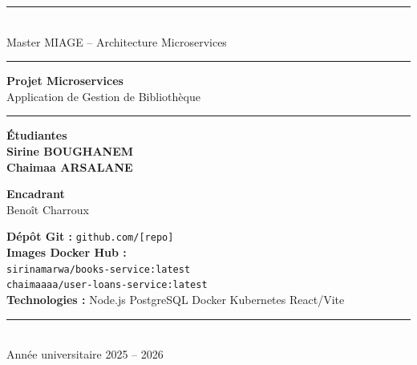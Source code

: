 \documentclass[12pt,a4paper]{article}
\begin{document}
\begin{titlepage}
  \thispagestyle{empty}
  \centering

  {\color{mainblue}\rule{\linewidth}{3pt}}\\[0.3cm]
  {\small\color{darkgray} Master MIAGE -- Architecture Microservices}\\[0.2cm]
  {\color{mainblue}\rule{\linewidth}{1pt}}

  \vspace{1.5cm}

  {\fontsize{34}{42}\bfseries\color{mainblue} Projet Microservices}\\[0.4cm]
  {\LARGE\color{darkgray} Application de Gestion de Bibliothèque}\\[0.6cm]

  {\color{mainblue}\rule{0.6\linewidth}{1.5pt}}

  \vspace{1cm}

  \begin{minipage}{0.45\textwidth}
    \raggedright
    {\small\color{darkgray}\textbf{Étudiantes}}\\[0.2cm]
    {\large\textbf{Sirine BOUGHANEM}}\\[0.1cm]
    {\large\textbf{Chaimaa ARSALANE}}
  \end{minipage}
  \hfill
  \begin{minipage}{0.45\textwidth}
    \raggedleft
    {\small\color{darkgray}\textbf{Encadrant}}\\[0.2cm]
    {\large Benoît Charroux}
  \end{minipage}

  \vspace{0.8cm}

  \begin{infobox}
  \textbf{Dépôt Git :} \texttt{github.com/[repo]}\\[2pt]
  \textbf{Images Docker Hub :}\\
  \quad \texttt{sirinamarwa/books-service:latest}\\
  \quad \texttt{chaimaaaa/user-loans-service:latest}\\[2pt]
  \textbf{Technologies :} Node.js \textbullet{} PostgreSQL \textbullet{} Docker \textbullet{} Kubernetes \textbullet{} React/Vite
  \end{infobox}

  \vspace{0.4cm}

  {\color{mainblue}\rule{\linewidth}{3pt}}\\[0.3cm]
  {\small\color{darkgray} Année universitaire 2025 -- 2026}

\end{titlepage}
\end{document}

